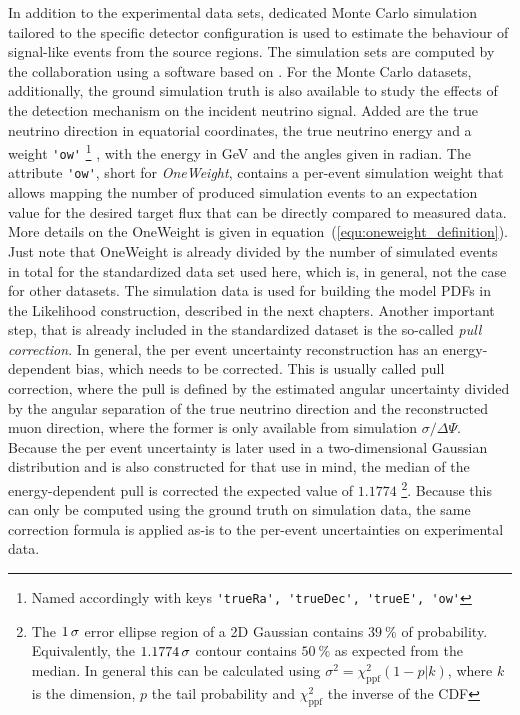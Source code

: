 In addition to the experimental data sets, dedicated Monte Carlo simulation tailored to the specific detector configuration is used to estimate the behaviour of signal-like events from the source regions.
The simulation sets are computed by the collaboration using a software based on .
For the Monte Carlo datasets, additionally, the ground simulation truth is also available to study the effects of the detection mechanism on the incident neutrino signal.
Added are the true neutrino direction in equatorial coordinates, the true neutrino energy and a weight \lstinline!'ow'! \footnote{Named accordingly with keys \lstinline!'trueRa', 'trueDec', 'trueE', 'ow'!} , with the energy in GeV and the angles given in radian.
The attribute \lstinline!'ow'!, short for \emph{OneWeight}, contains a per-event simulation weight that allows mapping the number of produced simulation events to an expectation value for the desired target flux that can be directly compared to measured data.
More details on the OneWeight is given in equation~(\ref{equ:oneweight_definition}).
Just note that OneWeight is already divided by the number of simulated events in total for the standardized data set used here, which is, in general, not the case for other datasets.
The simulation data is used for building the model PDFs in the Likelihood construction, described in the next chapters.
Another important step, that is already included in the standardized dataset is the so-called \emph{pull correction}.
In general, the per event uncertainty reconstruction has an energy-dependent bias, which needs to be corrected.
This is usually called pull correction, where the pull is defined by the estimated angular uncertainty divided by the angular separation of the true neutrino direction and the reconstructed muon direction, where the former is only available from simulation $\sigma / \Delta\Psi$.
Because the per event uncertainty is later used in a two-dimensional Gaussian distribution and is also constructed for that use in mind, the median of the energy-dependent pull is corrected the expected value of $\num{1.1774}$ \footnote{The $\num{1}\,\sigma$ error ellipse region of a 2D Gaussian contains $\SI{39}{\percent}$ of probability. Equivalently, the $\num{1.1774}\,\sigma$ contour contains $\SI{50}{\percent}$ as expected from the median. In general this can be calculated using $\sigma^2 = \chi^2_\text{ppf}(1-p|k)$, where $k$ is the dimension, $p$ the tail probability and $\chi^2_\text{ppf}$ the inverse of the CDF }.
Because this can only be computed using the ground truth on simulation data, the same correction formula is applied as-is to the per-event uncertainties on experimental data.

